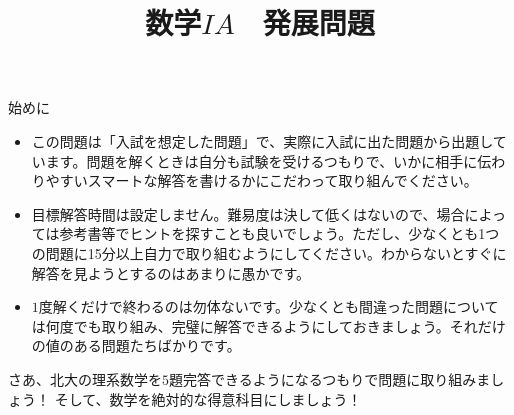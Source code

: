 \documentclass[10pt,a4paper,fleqn]{jsarticle}
\title{数学$IA$　発展問題}
\date{}
\author{}
\begin{document}
\maketitle

\begin{itembox}{始めに}
\begin{flushleft}
\begin{itemize}
\item この問題は「入試を想定した問題」で、実際に入試に出た問題から出題しています。問題を解くときは自分も試験を受けるつもりで、いかに相手に伝わりやすいスマートな解答を書けるかにこだわって取り組んでください。\\
\item 目標解答時間は設定しません。難易度は決して低くはないので、場合によっては参考書等でヒントを探すことも良いでしょう。ただし、少なくとも1つの問題に15分以上自力で取り組むようにしてください。わからないとすぐに解答を見ようとするのはあまりに愚かです。\\
\item $1$度解くだけで終わるのは勿体ないです。少なくとも間違った問題については何度でも取り組み、完璧に解答できるようにしておきましょう。それだけの値のある問題たちばかりです。
\end{itemize}
\end{flushleft}
\end{itembox}

さあ、北大の理系数学を$5$題完答できるようになるつもりで問題に取り組みましょう！
そして、数学を絶対的な得意科目にしましょう！
\end{document}
